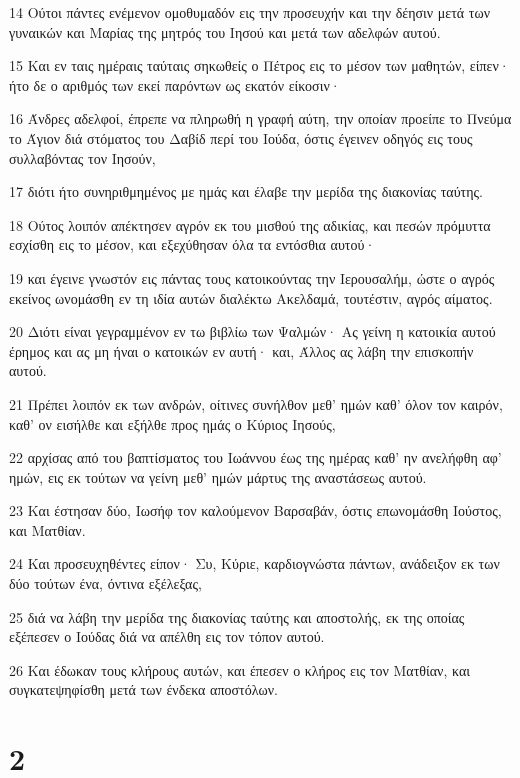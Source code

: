 \par 14 Ούτοι πάντες ενέμενον ομοθυμαδόν εις την προσευχήν και την δέησιν μετά των γυναικών και Μαρίας της μητρός του Ιησού και μετά των αδελφών αυτού.
\par 15 Και εν ταις ημέραις ταύταις σηκωθείς ο Πέτρος εις το μέσον των μαθητών, είπεν· ήτο δε ο αριθμός των εκεί παρόντων ως εκατόν είκοσιν·
\par 16 Άνδρες αδελφοί, έπρεπε να πληρωθή η γραφή αύτη, την οποίαν προείπε το Πνεύμα το Άγιον διά στόματος του Δαβίδ περί του Ιούδα, όστις έγεινεν οδηγός εις τους συλλαβόντας τον Ιησούν,
\par 17 διότι ήτο συνηριθμημένος με ημάς και έλαβε την μερίδα της διακονίας ταύτης.
\par 18 Ούτος λοιπόν απέκτησεν αγρόν εκ του μισθού της αδικίας, και πεσών πρόμυττα εσχίσθη εις το μέσον, και εξεχύθησαν όλα τα εντόσθια αυτού·
\par 19 και έγεινε γνωστόν εις πάντας τους κατοικούντας την Ιερουσαλήμ, ώστε ο αγρός εκείνος ωνομάσθη εν τη ιδία αυτών διαλέκτω Ακελδαμά, τουτέστιν, αγρός αίματος.
\par 20 Διότι είναι γεγραμμένον εν τω βιβλίω των Ψαλμών· Ας γείνη η κατοικία αυτού έρημος και ας μη ήναι ο κατοικών εν αυτή· και, Άλλος ας λάβη την επισκοπήν αυτού.
\par 21 Πρέπει λοιπόν εκ των ανδρών, οίτινες συνήλθον μεθ' ημών καθ' όλον τον καιρόν, καθ' ον εισήλθε και εξήλθε προς ημάς ο Κύριος Ιησούς,
\par 22 αρχίσας από του βαπτίσματος του Ιωάννου έως της ημέρας καθ' ην ανελήφθη αφ' ημών, εις εκ τούτων να γείνη μεθ' ημών μάρτυς της αναστάσεως αυτού.
\par 23 Και έστησαν δύο, Ιωσήφ τον καλούμενον Βαρσαβάν, όστις επωνομάσθη Ιούστος, και Ματθίαν.
\par 24 Και προσευχηθέντες είπον· Συ, Κύριε, καρδιογνώστα πάντων, ανάδειξον εκ των δύο τούτων ένα, όντινα εξέλεξας,
\par 25 διά να λάβη την μερίδα της διακονίας ταύτης και αποστολής, εκ της οποίας εξέπεσεν ο Ιούδας διά να απέλθη εις τον τόπον αυτού.
\par 26 Και έδωκαν τους κλήρους αυτών, και έπεσεν ο κλήρος εις τον Ματθίαν, και συγκατεψηφίσθη μετά των ένδεκα αποστόλων.

\chapter{2}

